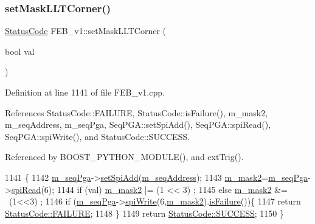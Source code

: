 \subsubsection{\texorpdfstring{set\+Mask\+L\+L\+T\+Corner()}{setMaskLLTCorner()}}
{\footnotesize\ttfamily \hyperlink{classStatusCode}{Status\+Code} F\+E\+B\+\_\+v1\+::set\+Mask\+L\+L\+T\+Corner (\begin{DoxyParamCaption}\item[{bool}]{val }\end{DoxyParamCaption})}



Definition at line 1141 of file F\+E\+B\+\_\+v1.\+cpp.



References Status\+Code\+::\+F\+A\+I\+L\+U\+RE, Status\+Code\+::is\+Failure(), m\+\_\+mask2, m\+\_\+seq\+Address, m\+\_\+seq\+Pga, Seq\+P\+G\+A\+::set\+Spi\+Add(), Seq\+P\+G\+A\+::spi\+Read(), Seq\+P\+G\+A\+::spi\+Write(), and Status\+Code\+::\+S\+U\+C\+C\+E\+SS.



Referenced by B\+O\+O\+S\+T\+\_\+\+P\+Y\+T\+H\+O\+N\+\_\+\+M\+O\+D\+U\+L\+E(), and ext\+Trig().


\begin{DoxyCode}
1141                                            \{
1142   \hyperlink{classFEB__v1_a6c7804ac86796f233a8393043adf2e77}{m\_seqPga}->\hyperlink{classSeqPGA_ac998ce3a6d9b5f2e88cc8393f8c1df53}{setSpiAdd}(\hyperlink{classFEB__v1_a1c1eb093fd1733b9510fcf8bc5c7ad08}{m\_seqAddress});
1143   \hyperlink{classFEB__v1_a25f03f6de00618dd575fc1f77a9af9ee}{m\_mask2}=\hyperlink{classFEB__v1_a6c7804ac86796f233a8393043adf2e77}{m\_seqPga}->\hyperlink{classSeqPGA_ab3d0e5e5d4014bc7a92588a76b8713d4}{spiRead}(6);
1144   \textcolor{keywordflow}{if} (val)  \hyperlink{classFEB__v1_a25f03f6de00618dd575fc1f77a9af9ee}{m\_mask2} |= (1 << 3)  ;
1145   \textcolor{keywordflow}{else}      \hyperlink{classFEB__v1_a25f03f6de00618dd575fc1f77a9af9ee}{m\_mask2} &= ~(1<<3) ;
1146   \textcolor{keywordflow}{if} (\hyperlink{classFEB__v1_a6c7804ac86796f233a8393043adf2e77}{m\_seqPga}->\hyperlink{classSeqPGA_ad4421841ce4ce8b88ad13f63216f0743}{spiWrite}(6,\hyperlink{classFEB__v1_a25f03f6de00618dd575fc1f77a9af9ee}{m\_mask2}).\hyperlink{classStatusCode_a5dd22dc6eb2c52fc4cabc58f6dea2eb7}{isFailure}())\{
1147     \textcolor{keywordflow}{return} \hyperlink{classStatusCode_a6f565cbeadc76d14c72f047e5e85eb4ba3da73d4c469762eb9d3c960368252b26}{StatusCode::FAILURE};
1148   \}
1149   \textcolor{keywordflow}{return} \hyperlink{classStatusCode_a6f565cbeadc76d14c72f047e5e85eb4badd0da38d3ba0d922efd1f4619bc37ad8}{StatusCode::SUCCESS};  
1150 \}
\end{DoxyCode}
\mbox{\label{classFEB__v1_a519a955361c420680af64c7fa9410784}} 
